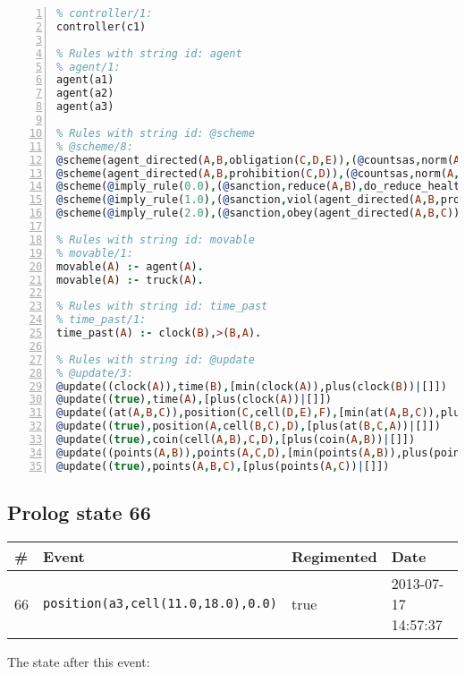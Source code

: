 \documentclass[11pt]{article}\usepackage[utf8]{inputenc}\usepackage{geometry}
\begin{document}
\begin{lstlisting}[language=Prolog, numbers=left]
% Rules with string id: controller
% controller/1:
controller(c1)

% Rules with string id: agent
% agent/1:
agent(a1)
agent(a2)
agent(a3)

% Rules with string id: @scheme
% @scheme/8:
@scheme(agent_directed(A,B,obligation(C,D,E)),(@countsas,norm(A,B,F,obligation(C,D,E)),F),false,(listTrue(C)),(time_past(D)),false,[plus(viol(agent_directed(A,B,obligation(C,D,E))))|[]],[plus(obey(agent_directed(A,B,obligation(C,D,E))))|[]])
@scheme(agent_directed(A,B,prohibition(C,D)),(@countsas,norm(A,B,E,prohibition(C,D)),E),(listTrue(C)),false,(false),false,[plus(viol(agent_directed(A,B,prohibition(C,D))))|[]],[plus(obey(agent_directed(A,B,prohibition(C,D))))|[]])
@scheme(@imply_rule(0.0),(@sanction,reduce(A,B),do_reduce_health(A,B),notifyAgent(A,changed(status))),true,false,false,false,[min(reduce(A,B))|[]],[])
@scheme(@imply_rule(1.0),(@sanction,viol(agent_directed(A,B,prohibition(C,D))),do_sanction(D)),true,false,false,false,[min(viol(agent_directed(A,B,prohibition(C,D))))|[]],[])
@scheme(@imply_rule(2.0),(@sanction,obey(agent_directed(A,B,C))),true,false,false,false,[min(obey(agent_directed(A,B,C)))|[]],[])

% Rules with string id: movable
% movable/1:
movable(A) :- agent(A).
movable(A) :- truck(A).

% Rules with string id: time_past
% time_past/1:
time_past(A) :- clock(B),>(B,A).

% Rules with string id: @update
% @update/3:
@update((clock(A)),time(B),[min(clock(A)),plus(clock(B))|[]])
@update((true),time(A),[plus(clock(A))|[]])
@update((at(A,B,C)),position(C,cell(D,E),F),[min(at(A,B,C)),plus(at(D,E,C))|[]])
@update((true),position(A,cell(B,C),D),[plus(at(B,C,A))|[]])
@update((true),coin(cell(A,B),C,D),[plus(coin(A,B))|[]])
@update((points(A,B)),points(A,C,D),[min(points(A,B)),plus(points(A,D))|[]])
@update((true),points(A,B,C),[plus(points(A,C))|[]])

\end{lstlisting}
\clearpage 
\subsection{Prolog state 66}
\begin{table}[ht]
\centering 
\begin{tabular}{l l l l} 
\textbf{\#} & \textbf{Event} & \textbf{Regimented} & \textbf{Date} \\ [0.5ex] 
\hline
66&\texttt{position(a3,cell(11.0,18.0),0.0)}&true&2013-07-17 14:57:37\\ [1ex] \hline\end{tabular}
\end{table}
The state after this event:
\end{document}
